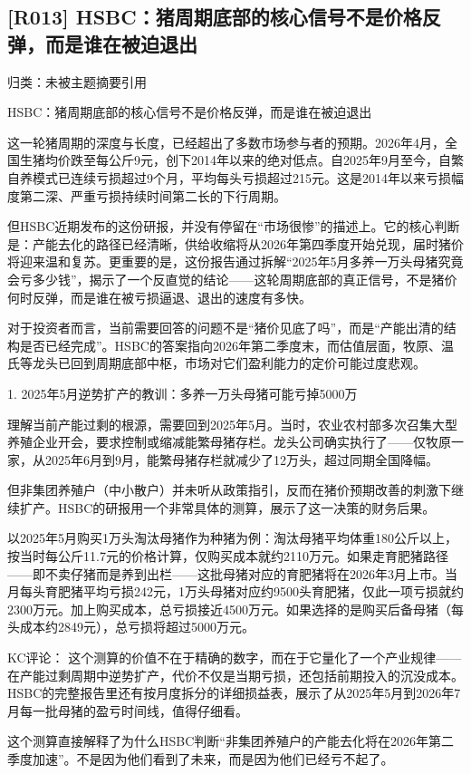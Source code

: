 \documentclass[11pt]{ctexart}
\begin{document}
\subsection{[R013] HSBC：猪周期底部的核心信号不是价格反弹，而是谁在被迫退出}
{\small\color{refgray}归类：未被主题摘要引用}

HSBC：猪周期底部的核心信号不是价格反弹，而是谁在被迫退出

这一轮猪周期的深度与长度，已经超出了多数市场参与者的预期。2026年4月，全国生猪均价跌至每公斤9元，创下2014年以来的绝对低点。自2025年9月至今，自繁自养模式已连续亏损超过9个月，平均每头亏损超过215元。这是2014年以来亏损幅度第二深、严重亏损持续时间第二长的下行周期。

但HSBC近期发布的这份研报，并没有停留在“市场很惨”的描述上。它的核心判断是：产能去化的路径已经清晰，供给收缩将从2026年第四季度开始兑现，届时猪价将迎来温和复苏。更重要的是，这份报告通过拆解“2025年5月多养一万头母猪究竟会亏多少钱”，揭示了一个反直觉的结论——这轮周期底部的真正信号，不是猪价何时反弹，而是谁在被亏损逼退、退出的速度有多快。

对于投资者而言，当前需要回答的问题不是“猪价见底了吗”，而是“产能出清的结构是否已经完成”。HSBC的答案指向2026年第二季度末，而估值层面，牧原、温氏等龙头已回到周期底部中枢，市场对它们盈利能力的定价可能过度悲观。

1. 2025年5月逆势扩产的教训：多养一万头母猪可能亏掉5000万

理解当前产能过剩的根源，需要回到2025年5月。当时，农业农村部多次召集大型养殖企业开会，要求控制或缩减能繁母猪存栏。龙头公司确实执行了——仅牧原一家，从2025年6月到9月，能繁母猪存栏就减少了12万头，超过同期全国降幅。

但非集团养殖户（中小散户）并未听从政策指引，反而在猪价预期改善的刺激下继续扩产。HSBC的研报用一个非常具体的测算，展示了这一决策的财务后果。

以2025年5月购买1万头淘汰母猪作为种猪为例：淘汰母猪平均体重180公斤以上，按当时每公斤11.7元的价格计算，仅购买成本就约2110万元。如果走育肥猪路径——即不卖仔猪而是养到出栏——这批母猪对应的育肥猪将在2026年3月上市。当月每头育肥猪平均亏损242元，1万头母猪对应约9500头育肥猪，仅此一项亏损就约2300万元。加上购买成本，总亏损接近4500万元。如果选择的是购买后备母猪（每头成本约2849元），总亏损将超过5000万元。

KC评论： 这个测算的价值不在于精确的数字，而在于它量化了一个产业规律——在产能过剩周期中逆势扩产，代价不仅是当期亏损，还包括前期投入的沉没成本。HSBC的完整报告里还有按月度拆分的详细损益表，展示了从2025年5月到2026年7月每一批母猪的盈亏时间线，值得仔细看。

这个测算直接解释了为什么HSBC判断“非集团养殖户的产能去化将在2026年第二季度加速”。不是因为他们看到了未来，而是因为他们已经亏不起了。
\end{document}
